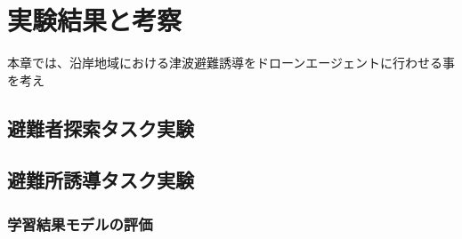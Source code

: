 \chapter{実験結果と考察}
本章では、沿岸地域における津波避難誘導をドローンエージェントに行わせる事を考え
\section{避難者探索タスク実験}

\section{避難所誘導タスク実験}
\subsection{学習結果モデルの評価}